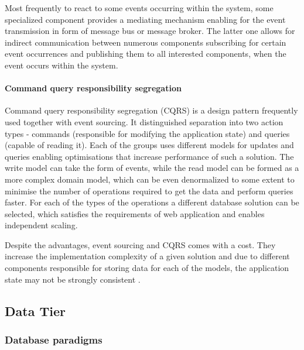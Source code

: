 Most frequently to react to some events occurring within the system, some specialized component provides a mediating mechanism enabling for the event transmission in form of message bus or message broker. The latter one allows for indirect communication between numerous components subscribing for certain event occurrences and publishing them to all interested components, when the event occurs within the system.

\paragraph{Command query responsibility segregation}

Command query responsibility segregation (CQRS) is a design pattern frequently used together with event sourcing. It distinguished separation into two action types - commands (responsible for modifying the application state) and queries (capable of reading it). Each of the groups uses different models for updates and queries enabling optimisations that increase performance of such a solution. The write model can take the form of events, while the read model can be formed as a more complex domain model, which can be even denormalized to some extent to minimise the number of operations required to get the data and perform queries faster. For each of the types of the operations a different database solution can be selected, which satisfies the requirements of web application and enables independent scaling. 

Despite the advantages, event sourcing and CQRS comes with a cost. They increase the implementation complexity of a given solution and due to different components responsible for storing data for each of the models, the application state may not be strongly consistent \cite{MicroservicesArchitecture}.

\subsection{Data Tier}

\subsubsection{Database paradigms} \label{chapter:database-paradigms}

